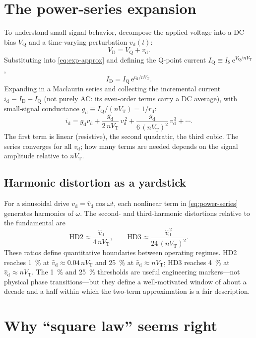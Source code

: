 \documentclass[12pt]{article}
\newcommand{\ID}{I_{\mathrm{D}}}
\newcommand{\VD}{V_{\mathrm{D}}}
\newcommand{\IS}{I_{\mathrm{S}}}
\newcommand{\VT}{V_{\mathrm{T}}}
\newcommand{\VQ}{V_{\mathrm{Q}}}
\newcommand{\IQ}{I_{\mathrm{Q}}}
\newcommand{\vd}{v_{\mathrm{d}}}
\newcommand{\id}{i_{\mathrm{d}}}
\newcommand{\gd}{g_{\mathrm{d}}}
\newcommand{\rd}{r_{\mathrm{d}}}
\newcommand{\vhd}{\hat{v}_{\mathrm{d}}}
\newcommand{\eu}{\mathrm{e}}
\begin{document}
\section*{The power-series expansion}

To understand small-signal behavior, decompose the applied voltage into a DC bias $\VQ$ and a time-varying perturbation $\vd(t)$:
\[
  \VD = \VQ + \vd.
\]
Substituting into \eqref{eq:exp-approx} and defining the Q-point current $\IQ \equiv \IS\, \eu^{\VQ / n \VT}$,
\[
  \ID = \IQ\, \eu^{\vd / n \VT}.
\]
Expanding in a Maclaurin series and collecting the incremental current $\id \equiv \ID - \IQ$ (not purely AC: its even-order terms carry a DC average), with small-signal conductance $\gd \equiv \IQ / (n\VT) = 1/\rd$:
\begin{equation}
  \id = \gd \vd + \frac{\gd}{2\, n \VT}\, \vd^{\,2} + \frac{\gd}{6\,(n \VT)^2}\, \vd^{\,3} + \cdots.
  \label{eq:power-series}
\end{equation}
The first term is linear (resistive), the second quadratic, the third cubic. The series converges for all $\vd$; how many terms are needed depends on the signal amplitude relative to $n\VT$.

\subsection*{Harmonic distortion as a yardstick}

For a sinusoidal drive $\vd = \vhd \cos\omega t$, each nonlinear term in \eqref{eq:power-series} generates harmonics of $\omega$. The second- and third-harmonic distortions relative to the fundamental are
\begin{equation}
  \mathrm{HD2} \approx \frac{\vhd}{4\, n \VT}, \qquad
  \mathrm{HD3} \approx \frac{\vhd^{\,2}}{24\,(n \VT)^2}.
  \label{eq:hd}
\end{equation}
These ratios define quantitative boundaries between operating regimes. HD2 reaches \SI{1}{\percent} at $\vhd \approx 0.04\,n\VT$ and \SI{25}{\percent} at $\vhd \approx n\VT$; HD3 reaches \SI{4}{\percent} at $\vhd \approx n\VT$. The \SI{1}{\percent} and \SI{25}{\percent} thresholds are useful engineering markers---not physical phase transitions---but they define a well-motivated window of about a decade and a half within which the two-term approximation is a fair description.

\section*{Why ``square law'' seems right}
\end{document}
